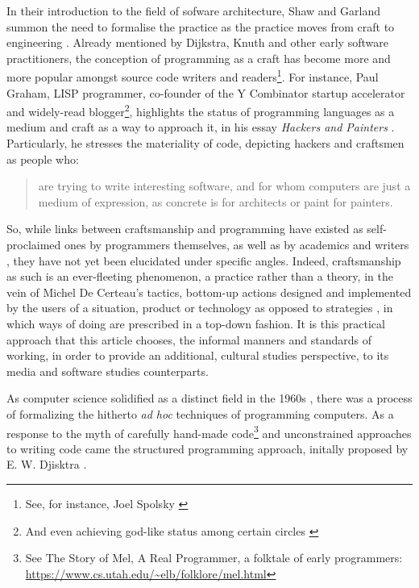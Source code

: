 In their introduction to the field of sofware architecture, Shaw and Garland summon the need to formalise the practice as the practice moves from craft to engineering \citep{shaw_software_1996}. Already mentioned by Dijkstra, Knuth and other early software practitioners, the conception of programming as a craft has become more and more popular amongst source code writers and readers\footnote{See, for instance, Joel Spolsky \citep{spolosky_craftsmanship_2003,seibel_coders_2009}}.  For instance, Paul Graham, LISP programmer, co-founder of the Y Combinator startup accelerator and widely-read blogger\footnote{And even achieving god-like status among certain circles \citep{eadicicco_startup_2014}}, highlights the status of programming languages as a medium and craft as a way to approach it, in his essay \emph{Hackers and Painters} \citep{graham_hackers_2003}. Particularly, he stresses the materiality of code, depicting hackers and craftsmen as people who:

\begin{quote}
  are trying to write interesting software, and for whom computers are just a medium of expression, as concrete is for architects or paint for painters.
\end{quote}

So, while links between craftsmanship and programming have existed as self-proclaimed ones by programmers themselves, as well as by academics and writers  \citep{sennett_craftsman_2009,chandra_geek_2014}, they have not yet been elucidated under specific angles. Indeed, craftsmanship as such is an ever-fleeting phenomenon, a practice rather than a theory, in the vein of Michel De Certeau's tactics, bottom-up actions designed and implemented by the users of a situation, product or technology as opposed to strategies \citep{certeau_invention_1990}, in which ways of doing are prescribed in a top-down fashion. It is this practical approach that this article chooses, the informal manners and standards of working, in order to provide an additional, cultural studies perspective, to its media and software studies counterparts.

As computer science solidified as a distinct field in the 1960s \citep{tedre_development_2006}, there was a process of formalizing the hitherto \emph{ad hoc} techniques of programming computers. As a response to the myth of carefully hand-made code\footnote{See The Story of Mel, A Real Programmer, a folktale of early programmers: \url{https://www.cs.utah.edu/~elb/folklore/mel.html}} and unconstrained approaches to writing code came the structured programming approach, initally proposed by E. W. Djisktra \citep{dijkstra_chapter_1972}.

